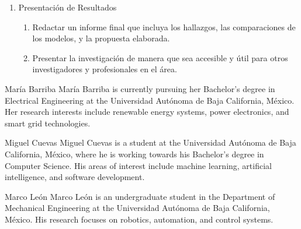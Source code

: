 \documentclass[10pt,journal,compsoc]{IEEEtran}
\begin{document}
\begin{enumerate}
\begin{enumerate}
              \item Elaborar una propuesta que incluya recomendaciones sobre los modelos y técnicas a utilizar, así como sugerencias para su futura implementación.
              \item Incluir un marco teórico que justifique la elección de cada técnica y su potencial impacto en la detección del TDAH.
          \end{enumerate}
    \item Presentación de Resultados
          \begin{enumerate}
              \item Redactar un informe final que incluya los hallazgos, las comparaciones de los modelos, y la propuesta elaborada.
              \item Presentar la investigación de manera que sea accesible y útil para otros investigadores y profesionales en el área.
          \end{enumerate}
\end{enumerate}

\printbibliography

\begin{IEEEbiography}{María Barriba}
    María Barriba is currently pursuing her Bachelor's degree in Electrical Engineering at the Universidad Autónoma de Baja California, México. Her research interests include renewable energy systems, power electronics, and smart grid technologies.
\end{IEEEbiography}

\begin{IEEEbiography}{Miguel Cuevas}
    Miguel Cuevas is a student at the Universidad Autónoma de Baja California, México, where he is working towards his Bachelor's degree in Computer Science. His areas of interest include machine learning, artificial intelligence, and software development.
\end{IEEEbiography}

\begin{IEEEbiography}{Marco León}
    Marco León is an undergraduate student in the Department of Mechanical Engineering at the Universidad Autónoma de Baja California, México. His research focuses on robotics, automation, and control systems.
\end{IEEEbiography}
\end{document}
